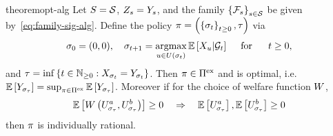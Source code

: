 \begin{restatable}{theorem}{opt-alg}
    \label{thm:opt-alg}
    Let $S=\mathcal{S}$, $Z_{s}=Y_{s}$,
    and the family 
    \(
        \left\{
            \mathcal{F}_{s}
        \right\}_{s\in\mathcal{S}}
    \) be given by~\eqref{eq:family-sig-alg}.
    Define
    the policy
    \(
        \pi=
        \left(
            \left\{
                \sigma_{t}
            \right\}_{t\geq 0},
            \tau
        \right)
    \)
    via
    \begin{align*}
        \sigma_{0} = (0,0),
        \quad
        \sigma_{t+1}
        =
        \operatorname*{argmax}_{
            u\in 
            U(
                \sigma_{t}
            )
        }
        \mathbb{E}\left[
            X_{u}
            | \mathcal{G}_{t}
        \right]
        ~~~\text{ for }~~~~t\geq 0,
    \end{align*}  
    and 
    \(
        \tau
        =
        \inf
        \left\{
            t\in\mathbb{N}_{\geq 0} :
            X_{
                \sigma_{t}
            }
            =
            Y_{
                \sigma_{t}
            }
        \right\}
    \). 
    Then $\pi\in\Pi^{\text{ex}}$ and is optimal, i.e.
    \(
        \mathbb{E}\left[
            Y_{
                \sigma_{\tau}
            }
        \right]
        =
        \sup_{
            \pi
            \in
            \Pi^{\text{ex}}
        }
        \mathbb{E}\left[
            Y_{
                \sigma_{\tau}
            }
        \right]
    \). 
    Moreover if
    for the choice 
    of welfare function $W$,
    \[
        \mathbb{E}\left[
            W\left(
                U^a_{
                    \sigma_{\tau}
                },
                U^b_{
                    \sigma_{\tau}
                }
            \right)
        \right]
        \geq 0
        ~~~
        \Rightarrow
        ~~~
        \mathbb{E}\left[
            U^a_{
                \sigma_{\tau}
            }
        \right],
        \mathbb{E}\left[
            U^b_{
                \sigma_{\tau}
            }
        \right]
        \geq 0
    \]
    then $\pi$ is individually rational.
\end{restatable}  

